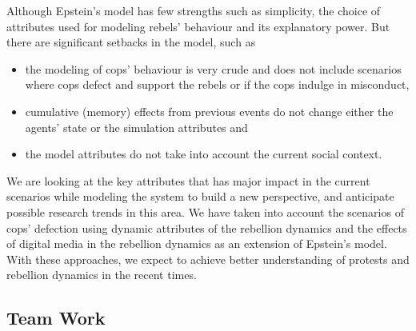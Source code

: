 \documentclass[a4paper,11pt]{article}
\begin{document}
Although Epstein's model has few strengths such as simplicity, the choice of attributes used for modeling rebels' behaviour and its explanatory power. But there are significant setbacks in the model, such as 
\begin{itemize}
    \item the modeling of cops’ behaviour is very crude and does not include scenarios where cops defect and support the rebels or if the cops indulge in misconduct,
    \item cumulative (memory) effects from previous events do not change either the agents’ state or the simulation attributes and
    \item the model attributes do not take into account the current social context.
\end{itemize}
We are looking at the key attributes that has major impact in the current scenarios while modeling the system to build a new perspective, and anticipate possible research trends in this area. We have taken into account the scenarios of cops' defection using dynamic attributes of the rebellion dynamics and the effects of digital media in the rebellion dynamics as an extension of Epstein's model. With these approaches, we expect to achieve better understanding of protests and rebellion dynamics in the recent times.

\subsection{Team Work}
\end{document}
